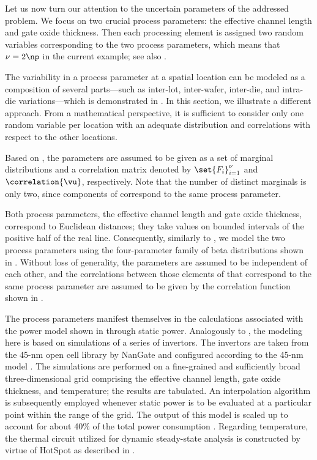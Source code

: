 Let us now turn our attention to the uncertain parameters \vu of the addressed
problem. We focus on two crucial process parameters: the effective channel
length and gate oxide thickness. Then each processing element is assigned two
random variables corresponding to the two process parameters, which means that
$\nu = 2 \np$ in the current example; see also .

\begin{remark}
The variability in a process parameter at a spatial location can be modeled as a
composition of several parts---such as inter-lot, inter-wafer, inter-die, and
intra-die variations---which is demonstrated in
. In this section, we illustrate a different
approach. From a mathematical perspective, it is sufficient to consider only one
random variable per location with an adequate distribution and correlations with
respect to the other locations.
\end{remark}

Based on , the parameters \vu are assumed to be given as
a set of marginal distributions and a correlation matrix denoted by
$\set{F_i}_{i = 1}^\nu$ and $\correlation{\vu}$, respectively. Note that the
number of distinct marginals is only two, since \np components of \vu correspond
to the same process parameter.

Both process parameters, the effective channel length and gate oxide thickness,
correspond to Euclidean distances; they take values on bounded intervals of the
positive half of the real line. Consequently, similarly to
, we model the two process parameters using
the four-parameter family of beta distributions shown in
. Without loss of generality, the parameters are assumed
to be independent of each other, and the correlations between those elements of
\vu that correspond to the same process parameter are assumed to be given by the
correlation function shown in .

The process parameters manifest themselves in the calculations associated with
the power model shown in  through static power.
Analogously to , the modeling here is based on
 simulations of a series of  invertors. The invertors are
taken from the 45-nm open cell library by NanGate \cite{nangate} and configured
according to the 45-nm   model \cite{ptm}. The simulations are
performed on a fine-grained and sufficiently broad three-dimensional grid
comprising the effective channel length, gate oxide thickness, and temperature;
the results are tabulated. An interpolation algorithm is subsequently employed
whenever static power is to be evaluated at a particular point within the range
of the grid. The output of this model is scaled up to account for about 40\% of
the total power consumption \cite{liu2007}. Regarding temperature, the thermal
 circuit utilized for dynamic steady-state analysis is constructed by
virtue of HotSpot \cite{skadron2003} as described in .

